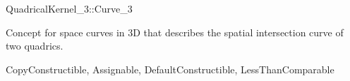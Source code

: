 
\begin{ccRefConcept}{QuadricalKernel_3::Curve_3}

Concept for space curves in 3D that describes the spatial intersection curve
of two quadrics.

\ccRefines
CopyConstructible, Assignable, DefaultConstructible, LessThanComparable


\ccSeeAlso


\end{ccRefConcept}
